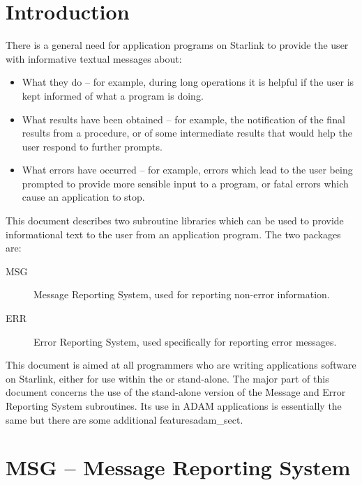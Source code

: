 \documentclass[twoside,11pt]{starlink}
\begin{document}
\scfrontmatter


\section{Introduction}

There is a general need for application programs on Starlink to provide the
user with informative textual messages about:

\begin {itemize}
\item What they do -- for example, during long operations it is helpful if the
user is kept informed of what a program is doing.

\item What results have been obtained -- for example, the notification of  the
final results from a procedure, or of some intermediate results that would help
the user respond to further prompts.

\item What errors have occurred -- for example, errors which lead to the user
being prompted to provide more sensible input to a program, or fatal
errors which cause an application to stop.
\end {itemize}

This document describes two subroutine libraries which can be used to provide
informational text to the user from an application program.
The two packages are:

\begin {description}
\item [MSG] Message Reporting System, used for reporting non-error information.
\item [ERR] Error Reporting System, used specifically for reporting error
messages.
\end {description}

This document is aimed at all programmers who are writing applications software
on Starlink, either for use within the
or stand-alone.
The major part of this document concerns the use of the stand-alone version of
the Message and Error Reporting System subroutines.
Its use in ADAM applications is essentially the same but there are some
\htmlref
{additional features}{adam_sect}.

\section{MSG -- Message Reporting System }
\end{document}
